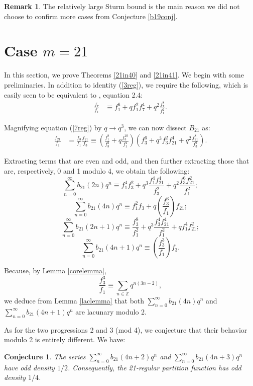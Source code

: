\documentclass[12pt]{amsart}
\newtheorem{conjecture}[theorem]{Conjecture}
\theoremstyle{definition}
\newtheorem{remark}[theorem]{Remark}
\begin{document}
\begin{remark} The relatively large Sturm bound is the main reason we did not choose to confirm more cases from Conjecture \ref{b19conj}.\end{remark}


\section{Case $m= 21$}\label{twentyonesec}

In this section, we prove Theorems \ref{21in40} and \ref{21in41}.  We begin with some preliminaries.  In addition to identity (\ref{3reg}), we require the following, which is easily seen to be equivalent to \cite{Lin}, equation 2.4:
\begin{align}\label{7reg}
\frac{f_7}{f_1} &\equiv f_1^6 + q f_1^2 f_7^4 + q^2 \frac{f_7^8}{f_1^2}.
\end{align}

Magnifying equation (\ref{7reg}) by $q \rightarrow q^3$, we can now dissect $B_{21}$ as:
\begin{align*} \frac{f_{21}}{f_1} &= \frac{f_3}{f_1}\frac{f_{21}}{f_3} \equiv \left( \frac{f_1^8}{f_3^2} + q \frac{f_3^{10}}{f_1^4}\right) \left(  f_3^6 + q^3 f_3^2 f_{21}^4 + q^2 \frac{f_{21}^8}{f_3^2}\right).
\end{align*}

Extracting  terms that are even and odd, and then further extracting those that are, respectively, 0 and 1 modulo 4, we obtain the following:
$$\sum_{n=0}^\infty b_{21}(2n) q^n \equiv f_1^4f_3^2 + q^3 \frac{f_1^4 f_{21}^4}{f_3^2} + q^2 \frac{f_3^6 f_{21}^2}{f_1^2};$$
$$\sum_{n=0}^\infty b_{21}(4n) q^n \equiv f_1^2 f_3 + q \left( \frac{f_3^3}{f_1} \right) f_{21};$$
$$\sum_{n=0}^\infty b_{21}(2n+1) q^n \equiv \frac{f_3^8}{f_1^2} + q^3 \frac{f_3^4 f_{21}^4}{f_1^2} + q f_1^4 f_{21}^2;$$
$$\sum_{n=0}^\infty b_{21}(4n+1) q^n \equiv \left( \frac{f_3^3}{f_1} \right) f_3 .$$

Because, by Lemma \ref{corelemma},
$$\frac{f_3^3}{f_1} \equiv \sum_{n \in \mathbb{Z}} q^{n(3n-2)},$$
we deduce from Lemma \ref{laclemma} that both $\sum_{n=0}^\infty b_{21}(4n) q^n$ and $\sum_{n=0}^\infty b_{21}(4n+1)q^n$ are lacunary modulo 2.  

As for the two progressions 2 and 3 (mod 4), we conjecture that their behavior modulo 2 is entirely different. We have:
\begin{conjecture} The series $\sum_{n=0}^\infty b_{21}(4n+2)q^n$ and $\sum_{n=0}^\infty b_{21}(4n+3)q^n$ have odd density $1/2$. Consequently, the 21-regular partition function has odd density $1/4$.
\end{conjecture}
\end{document}
